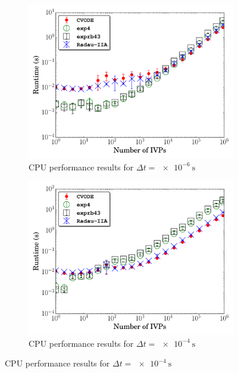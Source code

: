 \documentclass[preprint,review,11pt]{elsarticle}
\begin{document}
\begin{figure}[htbp]
  \centering
  \begin{subfigure}{0.49\textwidth}
      \includegraphics[width=\linewidth]{H2_1e-06_cpu_nonorm.pdf}
      \caption{CPU performance results for $\Delta t = \SI{e-6}{\second}$}
  \end{subfigure}
  \begin{subfigure}{0.49\textwidth}
      \includegraphics[width=\linewidth]{H2_1e-04_cpu_nonorm.pdf}
      \caption{CPU performance results for $\Delta t = \SI{e-4}{\second}$}


\end{subfigure}
\end{figure}
\end{document}
